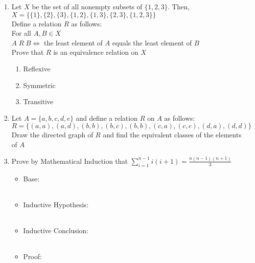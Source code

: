 \begin{enumerate}
    \item Let $X$ be the set of all nonempty subsets of $\{1,2,3\}$. Then, \\
    $X=\{\{1\}, \{2\},\{3\},\{1,2\},\{1,3\},\{2,3\},\{1,2,3\}\}$ \\
    Define a relation $R$ as follows: \\
    For all $A,B \in X$ \\
    $A \; R \; B \Longleftrightarrow$ the least element of $A$ equals the least element of $B$ \\
    Prove that $R$ is an equivalence relation on $X$
    \begin{enumerate}
    \item Reflexive \\
    \item Symmetric \\
    \item Transitive \\
    \end{enumerate}
    
    \item Let $A=\{a,b,c,d,e\}$ and define a relation $R$ on $A$ as follows: \\
    $R=\{(a,a),(a,d),(b,b),(b,c),(b,b),(c,a),(c,c),(d,a),(d,d)\}$ \\
    Draw the directed graph of $R$ and find the equivalent classes of the elements of $A$
    
    \item Prove by Mathematical Induction that $\sum_{i=1}^{n-1}i(i+1) = \frac{n(n-1)(n+1)}{3}$
    \begin{itemize}
    \item Base: \\ \\
    \item Inductive Hypothesis: \\ \\
    \item Inductive Conclusion: \\ \\
    \item Proof:\\ \\ \\ \\ \\ \\
    \end{itemize}
    

\end{enumerate}
